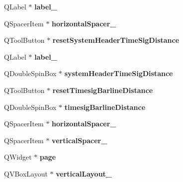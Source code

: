 \begin{DoxyCompactItemize}
Q\+Label $\ast$ {\bfseries label\+\_}
\item 
\mbox{\label{class_ui___edit_style_base_a7774e36079600a4fcbb69f1d8fc89c1b}} 
Q\+Spacer\+Item $\ast$ {\bfseries horizontal\+Spacer\+\_}
\item 
\mbox{\label{class_ui___edit_style_base_a8f6c3213437db7672cd436ca80f4089c}} 
Q\+Tool\+Button $\ast$ {\bfseries reset\+System\+Header\+Time\+Sig\+Distance}
\item 
\mbox{\label{class_ui___edit_style_base_ace03e816632c6c648bd2595656e67043}} 
Q\+Label $\ast$ {\bfseries label\+\_}
\item 
\mbox{\label{class_ui___edit_style_base_a5f3bc5cb543cde967d715c6c77dfaea3}} 
Q\+Double\+Spin\+Box $\ast$ {\bfseries system\+Header\+Time\+Sig\+Distance}
\item 
\mbox{\label{class_ui___edit_style_base_ae5f15c05c0b97849b54dd4ab0801401b}} 
Q\+Tool\+Button $\ast$ {\bfseries reset\+Timesig\+Barline\+Distance}
\item 
\mbox{\label{class_ui___edit_style_base_a3ef2bed7ab92bf78dfa24c6217a8d1fe}} 
Q\+Double\+Spin\+Box $\ast$ {\bfseries timesig\+Barline\+Distance}
\item 
\mbox{\label{class_ui___edit_style_base_a22e61c33244173d64e0c6d37dfc5cdaa}} 
Q\+Spacer\+Item $\ast$ {\bfseries horizontal\+Spacer\+\_}
\item 
\mbox{\label{class_ui___edit_style_base_a9e68b89127dcdbe9896d7030839f4bf8}} 
Q\+Spacer\+Item $\ast$ {\bfseries vertical\+Spacer\+\_}
\item 
\mbox{\label{class_ui___edit_style_base_afa7f1feba454860a2b31f108bad5c854}} 
Q\+Widget $\ast$ {\bfseries page}
\item 
\mbox{\label{class_ui___edit_style_base_a1f572e0aed7c5a9afbc2d1a4f4bbf937}} 
Q\+V\+Box\+Layout $\ast$ {\bfseries vertical\+Layout\+\_}

\end{DoxyCompactItemize}
